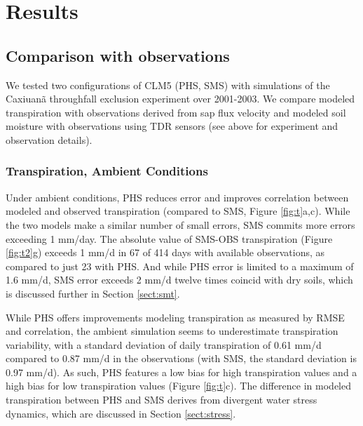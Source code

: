 \documentclass[draft,linenumbers]{agujournal}
\begin{document}
\section{Results}  

\subsection{Comparison with observations}
\label{sect:obs}

We tested two configurations of CLM5 (PHS, SMS) with simulations of the Caxiuan\~a throughfall exclusion experiment over 2001-2003. We compare modeled transpiration with observations derived from sap flux velocity and modeled soil moisture with observations using TDR sensors (see above for experiment and observation details).

\subsubsection{Transpiration, Ambient Conditions}
Under ambient conditions, PHS reduces error and improves correlation between modeled and observed transpiration (compared to SMS, Figure \ref{fig:t}a,c).
While the two models make a similar number of small errors, SMS commits more errors exceeding 1 mm/day.
The absolute value of SMS-OBS transpiration (Figure \ref{fig:t2}g) exceeds 1 mm/d in 67 of 414 days with available observations, as compared to just 23 with PHS.
And while PHS error is limited to a maximum of 1.6 mm/d, SMS error exceeds 2 mm/d twelve times
 coincid with dry soils, which is discussed further in Section \ref{sect:smt}. 

While PHS offers improvements modeling transpiration as measured by RMSE and correlation, the ambient simulation seems to underestimate transpiration variability, with a standard deviation of daily transpiration of 0.61 mm/d compared to 0.87 mm/d in the observations (with SMS, the standard deviation is 0.97 mm/d).
As such, PHS features a low bias for high transpiration values and a high bias for low transpiration values (Figure \ref{fig:t}c).
The difference in modeled transpiration between PHS and SMS derives from divergent water stress dynamics, which are discussed in Section \ref{sect:stress}.
\end{document}
